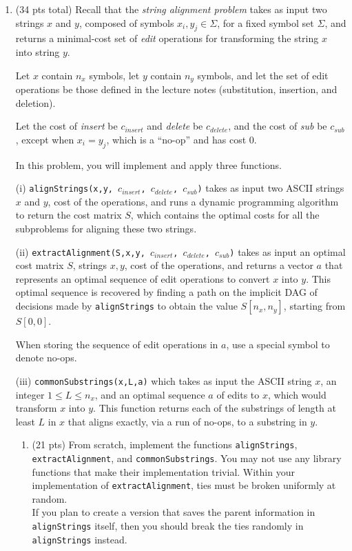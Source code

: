 \documentclass[12pt]{article}
\theoremstyle{remark}
\begin{document}
\begin{enumerate}
    
    	\item (34 pts total) Recall that the \textit{string alignment problem} takes as input two strings $x$ and $y$, composed of symbols $x_{i},y_{j}\in \Sigma$, for a fixed symbol set $\Sigma$, and returns a minimal-cost set of \textit{edit} operations for transforming the string $x$ into string $y$.
	
	Let $x$ contain $n_{x}$ symbols, let $y$ contain $n_{y}$ symbols, and let the set of edit operations be those defined in the lecture notes (substitution, insertion, and deletion).
	
	Let the cost of \textit{insert} be $c_{insert}$ and \textit{delete} be $c_{delete}$, and the cost of \textit{sub} be $c_{sub}$, except when $x_{i}=y_{j}$, which is a ``no-op'' and has cost 0.
	
	In this problem, you will implement and apply three functions.
	
	(i) {\tt alignStrings(x,y, $c_{insert}$, $c_{delete}$, $c_{sub}$)} takes as input two ASCII strings $x$ and $y$, cost of the operations, and runs a dynamic programming algorithm to return the cost matrix $S$, which contains the optimal costs for all the subproblems for aligning these two strings. 
	
	
	(ii) {\tt extractAlignment(S,x,y, $c_{insert}$, $c_{delete}$, $c_{sub}$)} takes as input an optimal cost matrix $S$, strings $x,y$, cost of the operations, and returns a vector $a$ that represents an optimal sequence of edit operations to convert $x$ into $y$. This optimal sequence is recovered by finding a path on the implicit DAG of decisions made by {\tt alignStrings} to obtain the value $S[n_{x},n_{y}]$, starting from $S[0,0]$. 
	
	When storing the sequence of edit operations in $a$, use a special symbol to denote no-ops.
	


	(iii) {\tt commonSubstrings(x,L,a)} which takes as input the ASCII string $x$, an integer $1\leq L \leq n_{x}$, and an optimal sequence $a$ of edits to $x$, which would transform $x$ into $y$. This function returns each of the substrings of length at least $L$ in $x$ that aligns exactly, via a run of no-ops, to a substring in $y$.
		\begin{enumerate}

	\item (21 pts) From scratch, implement the functions {\tt alignStrings}, {\tt extractAlignment}, and {\tt commonSubstrings}. You may not use any library functions that make their implementation trivial. Within your implementation of {\tt extractAlignment}, ties must be broken uniformly at random.\\
	If you plan to create a version that saves the parent information in {\tt alignStrings} itself, then you should break the ties randomly in {\tt alignStrings} instead. 
	

\end{enumerate}
\end{enumerate}
\end{document}

